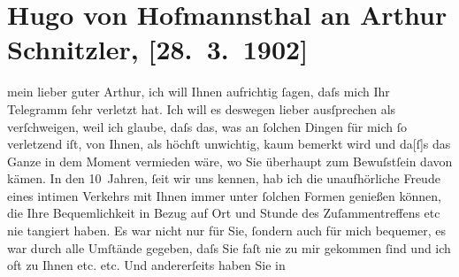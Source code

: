 

               \section[Hugo von Hofmannsthal an Arthur Schnitzler, {[}28. 3. 1902{]}]{ Hugo von Hofmannsthal an Arthur Schnitzler, {[}28. 3. 1902{]}}\nopagebreak{}\rehead{ }\begin{ledgroupsized}[t]{13cm}\normalsize\beginnumbering{} \toendnotes[C]{\smallbreak\pagebreak[2]} 
\toendnotes[C]{\smallbreak}\pstart{}{\pb}mein lieber guter
                  Arthur,\pend\pstart
           ich will Ihnen aufrichtig ſagen, daſs mich Ihr Telegramm ſehr verletzt hat. Ich will
               es deswegen lieber ausſprechen als verſchweigen, weil ich glaube, daſs das, was an
               ſolchen Dingen für mich ſo verletzend iſt, von Ihnen, als höchſt unwichtig, kaum {\pb}bemerkt wird und
                  da{[}ſ{]}s das Ganze in dem Moment vermieden wäre, wo Sie überhaupt
               zum Bewuſstſein davon kämen.\pend
           \pstart
           In den 10 Jahren, ſeit wir uns kennen, hab ich die unaufhörliche Freude eines intimen
               Verkehrs mit Ihnen immer unter ſolchen Formen {\pb}genießen können, die Ihre
               Bequemlichkeit in Bezug auf Ort und Stunde des Zuſammentreffens etc nie tangiert
               haben. Es war nicht nur für Sie, ſondern auch für mich bequemer, es war durch alle
               Umſtände gegeben, daſs Sie faſt nie zu mir gekommen ſind und ich oft zu Ihnen etc.
               etc.\pend
           \pstart
           {\pb}Und andererſeits haben Sie in

\end{ledgroupsized}
